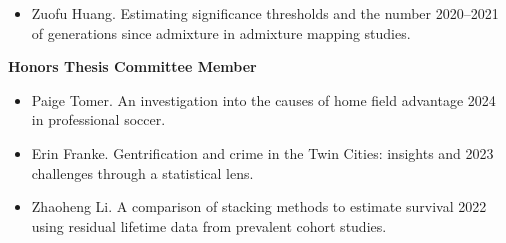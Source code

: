 \documentclass[margin]{res}
\begin{document}
\begin{resume}
\begin{itemize}
\item Zuofu Huang. Estimating significance thresholds and the number  \hfill 2020--2021 \\of generations since admixture in admixture mapping studies. %

\end{itemize}

\textbf{Honors Thesis Committee Member}
\begin{itemize}

\item Paige Tomer.  An investigation into the causes of home field advantage \hfill 2024 \\ in professional soccer. 

\item Erin Franke. Gentrification and crime in the Twin Cities: insights and \hfill 2023 \\ challenges through a statistical lens. 

\item Zhaoheng Li. A comparison of stacking methods to estimate survival  \hfill 2022 \\ using residual lifetime data from prevalent cohort studies.  \\

\end{itemize}



\end{resume}
\end{document}
